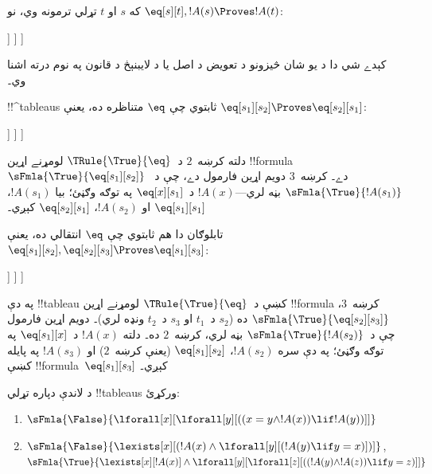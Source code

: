 \documentclass[../../../include/open-logic-section]{subfiles}
\begin{document}
\begin{ex}
که $s$ او $t$ تړلي ترمونه وي، نو
$\eq[s][t], !A(s) \Proves !A(t)$:
\begin{oltableau}
  [\sFmla{\False}{\formula{A}(t)}, just = \TAss
    [\sFmla{\True}{\eq[s][t]}, just = \TAss
      [\sFmla{\True}{\formula{A}(s)}, just = \TAss
        [\sFmla{\True}{\formula{A}(t)}, just={\TRule{\True}{\eq}[2, 3]}, close]
      ]
    ]
  ]
\end{oltableau}
کېدے شي دا د يو شان څيزونو د تعويض د اصل يا د لايبنېڅ د قانون په
نوم درته اشنا وي۔

!!^{tableau}s ثابتوي چې $\eq$ متناظره ده، يعنې
$\eq[s_1][s_2] \Proves \eq[s_2][s_1]$:
\begin{oltableau}
  [\sFmla{\False}{\eq[s_2][s_1]}, just = \TAss
    [\sFmla{\True}{\eq[s_1][s_2]}, just = \TAss
      [\sFmla{\True}{\eq[s_1][s_1]}, just = {$\eq$}
        [\sFmla{\True}{\eq[s_2][s_1]}, just = {\TRule{\True}{\eq}[2, 3]}, close]
      ]
    ]
  ]
\end{oltableau}
دلته کرښه~$2$ د~$\TRule{\True}{\eq}$ لومړنے اړين
!!{formula}~$\sFmla{\True}{\eq[s_1][s_2]}$ دے۔ کرښه~$3$ دويم
اړين فارمول دے، چې د~$\sFmla{\True}{!A(s_1)}$ بڼه لري---$!A(x)$
د~$\eq[x][s_1]$ په توګه وګڼئ؛ بيا $!A(s_1)$،
$\eq[s_1][s_1]$ او $!A(s_2)$، $\eq[s_2][s_1]$ کېږي۔

تابلوګان دا هم ثابتوي چې $\eq$ انتقالي ده، يعنې
$\eq[s_1][s_2], \eq[s_2][s_3] \Proves \eq[s_1][s_3]$:
\begin{oltableau}
  [\sFmla{\False}{\eq[s_1][s_3]}, just = \TAss
    [\sFmla{\True}{\eq[s_1][s_2]}, just = \TAss
      [\sFmla{\True}{\eq[s_2][s_3]}, just = \TAss
        [\sFmla{\True}{\eq[s_1][s_3]}, just = {\TRule{\True}{\eq}[3, 2]}, close]
      ]
    ]
  ]
\end{oltableau}
په دې !!{tableau} کښې د~$\TRule{\True}{\eq}$ لومړنے اړين
!!{formula} کرښه~$3$، $\sFmla{\True}{\eq[s_2][s_3]}$ ده
($s_2$ د~$t_1$ او $s_3$ د~$t_2$ ونډه لري)۔ دويم اړين فارمول چې
د~$\sFmla{\True}{!A(s_2)}$ بڼه لري، کرښه~$2$ ده۔ دلته $!A(x)$
د~$\eq[s_1][x]$ په توګه وګڼئ؛ په دې سره $!A(s_2)$،
$\eq[s_1][s_2]$ (يعنې کرښه~$2$) او $!A(s_3)$ په پايله کښې
!!{formula}~$\eq[s_1][s_3]$ کېږي۔
\end{ex}

\begin{prob}
د لاندې دپاره تړلي !!{tableau}s ورکړئ:
\begin{enumerate}
\item $\sFmla{\False}{\lforall[x][\lforall[y][((x = y \land !A(x))
      \lif !A(y))]]}$
\item $\sFmla{\False}{\lexists[x][(!A(x) \land
    \lforall[y][(!A(y) \lif y = x)])]}$,\\
  $\sFmla{\True}{\lexists[x][!A(x)] \land
    \lforall[y][\lforall[z][((!A(y) \land !A(z)) \lif y = z)]]}$
\end{enumerate}
\end{prob}
\end{document}
